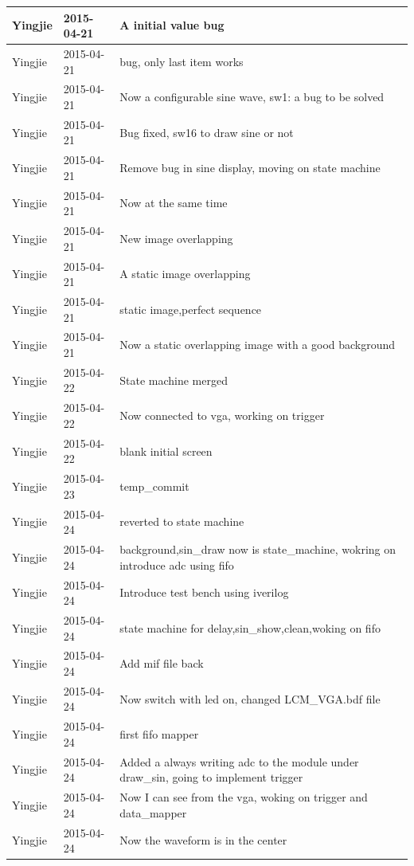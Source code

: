 \documentclass[11pt]{scrartcl}
\begin{document}
\begin{longtable}{@{\extracolsep{\fill}}lll@{}}
Yingjie & 2015-04-21 & A initial value bug \\ \hline
Yingjie & 2015-04-21 & bug, only last item works \\ \hline
Yingjie & 2015-04-21 & Now a configurable sine wave, sw1: a bug to be solved \\ \hline
Yingjie & 2015-04-21 & Bug fixed, sw16 to draw sine or not \\ \hline
Yingjie & 2015-04-21 & Remove bug in sine display, moving on state machine \\ \hline
Yingjie & 2015-04-21 & Now at the same time \\ \hline
Yingjie & 2015-04-21 & New image overlapping \\ \hline
Yingjie & 2015-04-21 & A static image overlapping \\ \hline
Yingjie & 2015-04-21 & static image,perfect sequence \\ \hline
Yingjie & 2015-04-21 & Now a static overlapping image with a good background \\ \hline
Yingjie & 2015-04-22 & State machine merged \\ \hline
Yingjie & 2015-04-22 & Now connected to vga, working on trigger \\ \hline
Yingjie & 2015-04-22 & blank initial screen \\ \hline
Yingjie & 2015-04-23 & temp\_commit \\ \hline
Yingjie & 2015-04-24 & reverted to state machine \\ \hline
Yingjie & 2015-04-24 & background,sin\_draw now is state\_machine, wokring on introduce adc using fifo \\ \hline
Yingjie & 2015-04-24 & Introduce test bench using iverilog \\ \hline
Yingjie & 2015-04-24 & state machine for delay,sin\_show,clean,woking on fifo \\ \hline
Yingjie & 2015-04-24 & Add mif file back \\ \hline
Yingjie & 2015-04-24 & Now switch with led on, changed LCM\_VGA.bdf file \\ \hline
Yingjie & 2015-04-24 & first fifo mapper \\ \hline
Yingjie & 2015-04-24 & Added a always writing adc to the module under draw\_sin, going to implement trigger \\ \hline
Yingjie & 2015-04-24 & Now I can see from the vga, woking on trigger and data\_mapper \\ \hline
Yingjie & 2015-04-24 & Now the waveform is in the center \\ \hline

\end{longtable}
\end{document}
